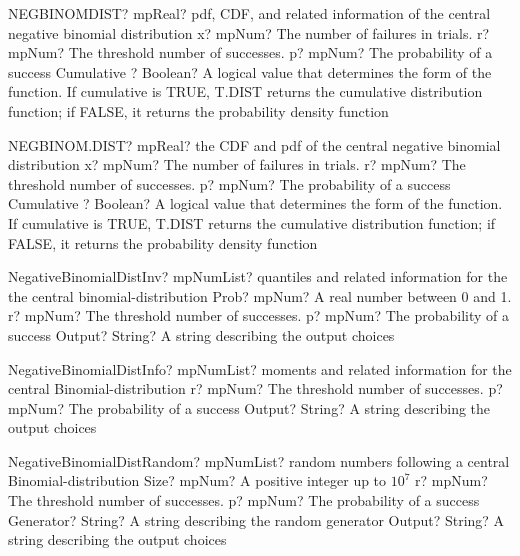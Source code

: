\documentclass[12pt,a4paper,openany]{book}
\begin{document}
\begin{mpFunctionsExtract}
\mpWorksheetFunctionFourNotImplemented
{NEGBINOMDIST? mpReal? pdf, CDF, and related information of the central negative binomial distribution}
{x? mpNum? The number of failures in trials.}
{r? mpNum? The threshold number of successes.}
{p? mpNum? The probability of a success}
{Cumulative ? Boolean? A logical value that determines the form of the function. If cumulative is TRUE, T.DIST returns the cumulative distribution function; if FALSE, it returns the probability density function}
\end{mpFunctionsExtract}

\begin{mpFunctionsExtract}
\mpWorksheetFunctionFourNotImplemented
{NEGBINOM.DIST? mpReal? the CDF and pdf of the central negative binomial distribution}
{x? mpNum? The number of failures in trials.}
{r? mpNum? The threshold number of successes.}
{p? mpNum? The probability of a success}
{Cumulative ? Boolean? A logical value that determines the form of the function. If cumulative is TRUE, T.DIST returns the cumulative distribution function; if FALSE, it returns the probability density function}
\end{mpFunctionsExtract}

\begin{mpFunctionsExtract}
\mpFunctionFourNotImplemented
{NegativeBinomialDistInv? mpNumList? quantiles and related information for the the central binomial-distribution}
{Prob? mpNum? A real number between 0 and 1.}
{r? mpNum? The threshold number of successes.}
{p? mpNum? The probability of a success}
{Output? String? A string describing the output choices}
\end{mpFunctionsExtract}

\begin{mpFunctionsExtract}
\mpFunctionThreeNotImplemented
{NegativeBinomialDistInfo? mpNumList? moments and related information for the central Binomial-distribution}
{r? mpNum? The threshold number of successes.}
{p? mpNum? The probability of a success}
{Output? String? A string describing the output choices}
\end{mpFunctionsExtract}

\begin{mpFunctionsExtract}
\mpFunctionFiveNotImplemented
{NegativeBinomialDistRandom? mpNumList? random numbers following a central Binomial-distribution}
{Size? mpNum? A positive integer up to $10^7$}
{r? mpNum? The threshold number of successes.}
{p? mpNum? The probability of a success}
{Generator? String? A string describing the random generator}
{Output? String? A string describing the output choices}
\end{mpFunctionsExtract}
\end{document}

